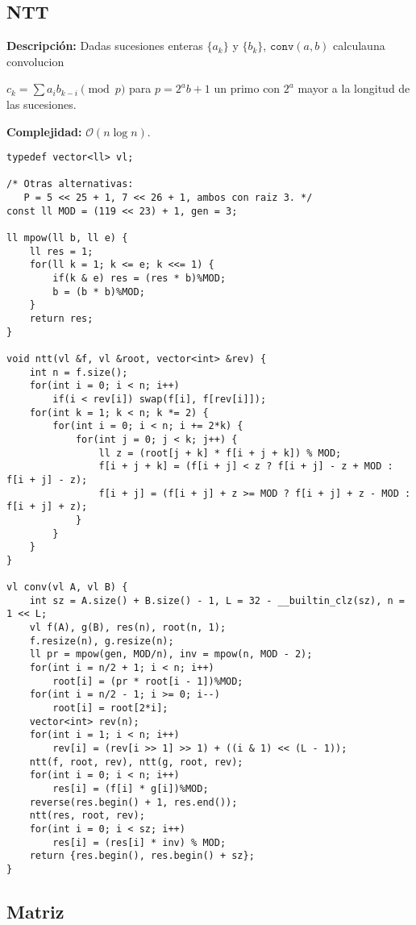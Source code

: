 \documentclass[twocolumn]{article}
\begin{document}
\subsection{NTT}
\begin{footnotesize}{\bf Descripción: } Dadas sucesiones enteras $\{a_k\}$ y $\{b_k\}$, $\texttt{conv}(a, b)$ calculauna convolucion


$c_k = \sum a_ib_{k - i} \pmod{p}$ para $p = 2^ab + 1$ un primo con $2^a$ mayor a la longitud de las sucesiones.


{\bf Complejidad: } $\mathcal{O}(n \log n)$.
\end{footnotesize}\lstset{basicstyle=\footnotesize\ttfamily,breaklines=true,tabsize=2,language=C++,frame=leftline, numbers=left, numberstyle=\tiny, numbersep=5pt}
\begin{lstlisting}
typedef vector<ll> vl;

/* Otras alternativas:
   P = 5 << 25 + 1, 7 << 26 + 1, ambos con raiz 3. */
const ll MOD = (119 << 23) + 1, gen = 3;

ll mpow(ll b, ll e) {
	ll res = 1;
	for(ll k = 1; k <= e; k <<= 1) {
		if(k & e) res = (res * b)%MOD;
		b = (b * b)%MOD;
	}
	return res;
}

void ntt(vl &f, vl &root, vector<int> &rev) {
	int n = f.size();
	for(int i = 0; i < n; i++)
		if(i < rev[i]) swap(f[i], f[rev[i]]);
	for(int k = 1; k < n; k *= 2) {
		for(int i = 0; i < n; i += 2*k) {
			for(int j = 0; j < k; j++) {
				ll z = (root[j + k] * f[i + j + k]) % MOD;
				f[i + j + k] = (f[i + j] < z ? f[i + j] - z + MOD : f[i + j] - z);
				f[i + j] = (f[i + j] + z >= MOD ? f[i + j] + z - MOD : f[i + j] + z);
			}
		}
	}
}

vl conv(vl A, vl B) {
	int sz = A.size() + B.size() - 1, L = 32 - __builtin_clz(sz), n = 1 << L;
	vl f(A), g(B), res(n), root(n, 1);
	f.resize(n), g.resize(n);
	ll pr = mpow(gen, MOD/n), inv = mpow(n, MOD - 2);
	for(int i = n/2 + 1; i < n; i++)
		root[i] = (pr * root[i - 1])%MOD;
	for(int i = n/2 - 1; i >= 0; i--)
		root[i] = root[2*i];
	vector<int> rev(n);
	for(int i = 1; i < n; i++)
		rev[i] = (rev[i >> 1] >> 1) + ((i & 1) << (L - 1));
	ntt(f, root, rev), ntt(g, root, rev);
	for(int i = 0; i < n; i++)
		res[i] = (f[i] * g[i])%MOD;
	reverse(res.begin() + 1, res.end());
	ntt(res, root, rev);
	for(int i = 0; i < sz; i++)
		res[i] = (res[i] * inv) % MOD;
	return {res.begin(), res.begin() + sz};
}

\end{lstlisting}
\subsection{Matriz}
\lstset{basicstyle=\footnotesize\ttfamily,breaklines=true,tabsize=2,language=C++,frame=leftline, numbers=left, numberstyle=\tiny, numbersep=5pt}
\begin{lstlisting}

\end{lstlisting}
\end{document}
